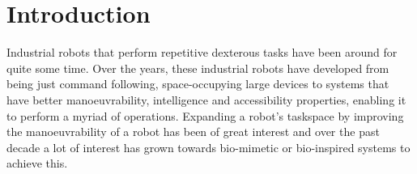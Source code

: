 \documentclass[a4paper,12pt]{report}
\begin{document}
\chapter{Introduction}

Industrial robots that perform repetitive dexterous tasks have been around for quite some time. Over the years, these industrial robots have developed from being just command following, space-occupying large devices to systems that have better manoeuvrability, intelligence and accessibility properties, enabling it to  perform a myriad of operations. Expanding a robot's taskspace by improving the manoeuvrability of a robot has been of great interest and over the past decade a lot of interest has grown towards bio-mimetic or bio-inspired systems to achieve this.
\end{document}
